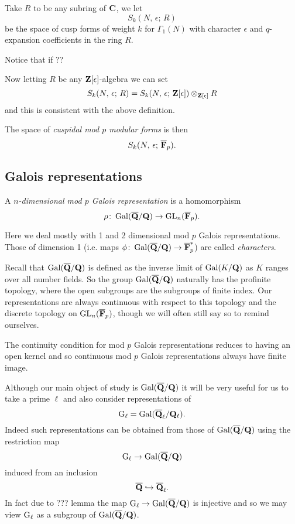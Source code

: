 \documentclass[a4paper,12pt]{article}
\begin{document}
\begin{defn}
Take $R$ to be any subring of $\mathbf{C}$, we let
\[
S_k(N,\, \epsilon;\, R)
\]
be the space of cusp forms of weight $k$ for $\Gamma_1(N)$ with character $\epsilon$ and $q$-expansion coefficients in the ring $R$.
\end{defn}

\begin{ex}
\end{ex}

Notice that if ??

\begin{defn}
Now letting $R$ be any $\mathbf{Z}[\epsilon]$-algebra we can set
\[
S_k(N,\, \epsilon;\, R) = S_k(N,\, \epsilon;\, \mathbf{Z}[\epsilon]) \otimes_{\mathbf{Z}[\epsilon]} R
\]
and this is consistent with the above definition.

The space of \emph{cuspidal mod $p$ modular forms} is then
\[
S_k(N,\, \epsilon;\, \overline{\mathbf{F}}_p).
\]
\end{defn}



\subsection{Galois representations}\label{sec-gals}
\begin{defn}
A \emph{$n$-dimensional mod $p$ Galois representation} is a homomorphism
\[
\rho\colon \operatorname{Gal}(\overline{\mathbf{Q}}/\mathbf{Q}) \to \operatorname{GL}_n(\overline{\mathbf{F}}_p).
\]
\end{defn}

Here we deal mostly with 1 and 2 dimensional mod $p$ Galois representations.
Those of dimension 1 (i.e. maps $\phi\colon\operatorname{Gal}(\overline{\mathbf{Q}}/\mathbf{Q}) \to \overline{\mathbf{F}}_p^*$) are called \emph{characters}.

Recall that $\operatorname{Gal}(\overline{\mathbf{Q}}/\mathbf{Q})$ is defined as the inverse limit of $\operatorname{Gal}(K/\mathbf{Q})$ as $K$ ranges over all number fields.
So the group $\operatorname{Gal}(\overline{\mathbf{Q}}/\mathbf{Q})$ naturally has the profinite topology, where the open subgroups are the subgroups of finite index.
Our representations are always continuous with respect to this topology and   the discrete topology on $\operatorname{GL}_n(\overline{\mathbf{F}}_p)$, though we will often still say so to remind ourselves.

\begin{rmk}\label{rmk-ctsfin}
The continuity condition for mod $p$ Galois representations reduces to having an open kernel and so continuous mod $p$ Galois representations always have finite image.
\end{rmk}

Although our main object of study is $\operatorname{Gal}(\overline{\mathbf{Q}}/\mathbf{Q})$ it will be very useful for us to take a prime $\ell$ and also consider representations of
\[
\mathrm{G}_\ell = \operatorname{Gal}(\overline{\mathbf{Q}}_\ell/\mathbf{Q}_\ell).
\]
Indeed such representations can be obtained from those of $\operatorname{Gal}(\overline{\mathbf{Q}}/\mathbf{Q})$ using the restriction map
\[
\mathrm{G}_\ell \to \operatorname{Gal}(\overline{\mathbf{Q}}/\mathbf{Q})
\]
induced from an inclusion
\[
\overline{\mathbf{Q}} \hookrightarrow \overline{\mathbf{Q}}_\ell.
\]
In fact due to ??? lemma the map $\mathrm{G}_\ell \to \operatorname{Gal}(\overline{\mathbf{Q}}/\mathbf{Q})$ is injective and so we may view $\mathrm{G}_\ell$ as a subgroup of $\operatorname{Gal}(\overline{\mathbf{Q}}/\mathbf{Q})$. %
\end{document}
